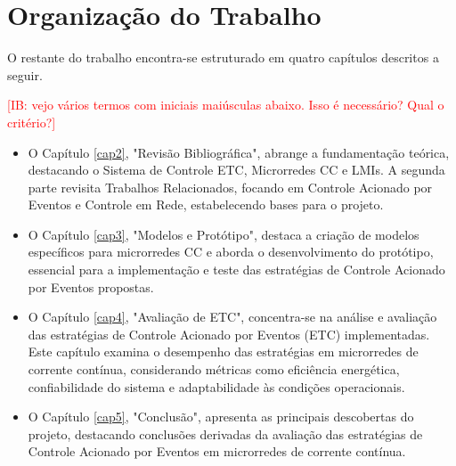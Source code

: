 \section{Organização do Trabalho}

O restante do trabalho encontra-se estruturado em quatro capítulos descritos a seguir.

\textcolor{red}{[IB: vejo vários termos com iniciais maiúsculas abaixo. Isso é necessário? Qual o critério?]}

\begin{itemize}
    \item O Capítulo \ref{cap2}, "Revisão Bibliográfica", abrange a fundamentação teórica, destacando o Sistema de Controle ETC, Microrredes CC e LMIs. A segunda parte revisita Trabalhos Relacionados, focando em Controle Acionado por Eventos e Controle em Rede, estabelecendo bases para o projeto.
    \item O Capítulo \ref{cap3}, "Modelos e Protótipo", destaca a criação de modelos específicos para microrredes CC e aborda o desenvolvimento do protótipo, essencial para a implementação e teste das estratégias de Controle Acionado por Eventos propostas.
    \item O Capítulo \ref{cap4}, "Avaliação de ETC", concentra-se na análise e avaliação das estratégias de Controle Acionado por Eventos (ETC) implementadas. Este capítulo examina o desempenho das estratégias em microrredes de corrente contínua, considerando métricas como eficiência energética, confiabilidade do sistema e adaptabilidade às condições operacionais.
    \item  O Capítulo \ref{cap5}, "Conclusão", apresenta as principais descobertas do projeto, destacando conclusões derivadas da avaliação das estratégias de Controle Acionado por Eventos em microrredes de corrente contínua.
\end{itemize}



